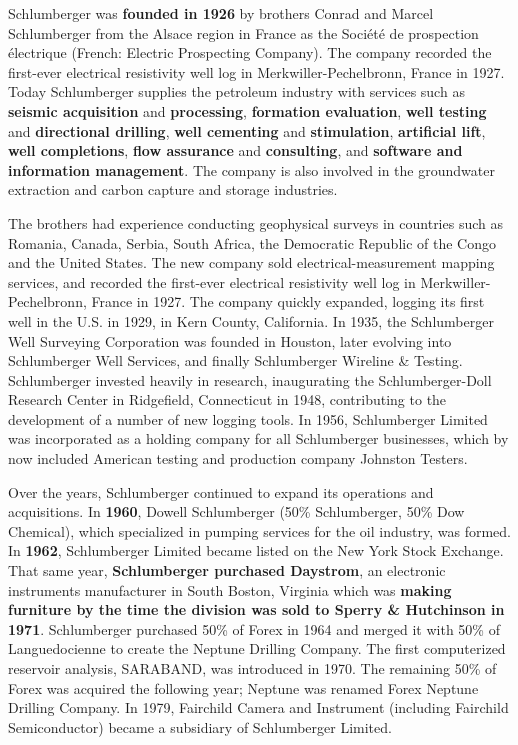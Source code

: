 \documentclass[12pt,a4paper]{article}
\begin{document}
Schlumberger was \textbf{founded in 1926} by brothers Conrad and Marcel
Schlumberger from the Alsace region in France as the Soci\'et\'e de
prospection \'electrique (French: Electric Prospecting Company). The company
recorded the first-ever electrical resistivity well log in
Merkwiller-Pechelbronn, France in 1927. Today Schlumberger supplies the
petroleum industry with services such as \textbf{seismic acquisition} and
\textbf{processing}, \textbf{formation evaluation}, \textbf{well testing}
and \textbf{directional drilling}, \textbf{well cementing} and
\textbf{stimulation}, \textbf{artificial lift}, \textbf{well completions},
\textbf{flow assurance} and \textbf{consulting}, and \textbf{software and
  information management}. The company is also involved in the groundwater
extraction and carbon capture and storage industries.

The brothers had experience conducting geophysical surveys in countries such
as Romania, Canada, Serbia, South Africa, the Democratic Republic of the
Congo and the United States. The new company sold electrical-measurement
mapping services, and recorded the first-ever electrical resistivity well
log in Merkwiller-Pechelbronn, France in 1927. The company quickly expanded,
logging its first well in the U.S. in 1929, in Kern County, California. In
1935, the Schlumberger Well Surveying Corporation was founded in Houston,
later evolving into Schlumberger Well Services, and finally Schlumberger
Wireline \& Testing. Schlumberger invested heavily in research, inaugurating
the Schlumberger-Doll Research Center in Ridgefield, Connecticut in 1948,
contributing to the development of a number of new logging tools. In 1956,
Schlumberger Limited was incorporated as a holding company for all
Schlumberger businesses, which by now included American testing and
production company Johnston Testers.

Over the years, Schlumberger continued to expand its operations and
acquisitions. In \textbf{1960}, Dowell Schlumberger (50\% Schlumberger, 50\%
Dow Chemical), which specialized in pumping services for the oil industry,
was formed. In \textbf{1962}, Schlumberger Limited became listed on the New
York Stock Exchange. That same year, \textbf{Schlumberger purchased
  Daystrom}, an electronic instruments manufacturer in South Boston,
Virginia which was \textbf{making furniture by the time the division was
  sold to Sperry \& Hutchinson in 1971}. Schlumberger purchased 50\% of
Forex in 1964 and merged it with 50\% of Languedocienne to create the
Neptune Drilling Company. The first computerized reservoir analysis,
SARABAND, was introduced in 1970. The remaining 50\% of Forex was acquired
the following year; Neptune was renamed Forex Neptune Drilling Company. In
1979, Fairchild Camera and Instrument (including Fairchild Semiconductor)
became a subsidiary of Schlumberger Limited.
\end{document}
